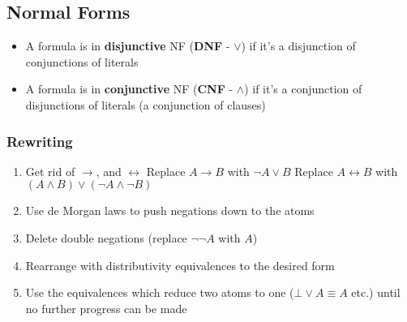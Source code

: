 \documentclass[a4paper, 12pt]{article}
\begin{document}
        \subsection*{Normal Forms}
        \begin{itemize}
            \item A formula is in \textbf{disjunctive} NF (\textbf{DNF} - $\lor$) if it's a disjunction of conjunctions of literals
            \item A formula is in \textbf{conjunctive} NF (\textbf{CNF} - $\land$) if it's a conjunction of disjunctions of literals (a conjunction of clauses)
        \end{itemize}
        \subsubsection*{Rewriting}
        \begin{enumerate}[1.]
            \item Get rid of $\rightarrow$, and $\leftrightarrow$
                \subitem Replace $A \rightarrow B$ with $\neg A \lor B$
                \subitem Replace $A \leftrightarrow B$ with $(A \land B) \lor (\neg A \land \neg B)$
            \item Use de Morgan laws to push negations down to the atoms
            \item Delete double negations (replace $\neg \neg A$ with $A$)
            \item Rearrange with distributivity equivalences to the desired form
            \item Use the equivalences which reduce two atoms to one ($\bot \lor A \equiv A$ etc.) until no further progress can be made
        \end{enumerate}
\end{document}
